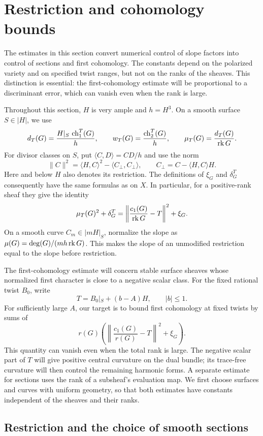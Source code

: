 \section{Restriction and cohomology bounds}
\label{sec:analysis}

The estimates in this section convert numerical control of slope factors
into control of sections and first cohomology.  The constants depend on the
polarized variety and on specified twist ranges, but not on the ranks of
the sheaves.  This distinction is essential: the first-cohomology estimate
will be proportional to a discriminant error, which can vanish even when
the rank is large.

Throughout this section, $H$ is very ample and $h=H^3$.  On a smooth
surface $S\in|H|$, we use
\[
 d_T(G)=\frac{H|_S\,\operatorname{ch}_1^T(G)}h,
 \qquad w_T(G)=\frac{\operatorname{ch}_2^T(G)}h,
 \qquad \mu_T(G)=\frac{d_T(G)}{\operatorname{rk} G}.
\]
For divisor classes on $S$, put $\langle C,D\rangle=CD/h$ and use the
norm
\[
 \|C\|^2=\langle H,C\rangle^2-\langle C_\perp,C_\perp\rangle,
 \qquad C_\perp=C-\langle H,C\rangle H.
\]
Here and below $H$ also denotes its restriction.  The definitions of
$\xi_G$ and $\delta_G^T$ consequently have the same formulas as on $X$.
In particular, for a positive-rank sheaf they give the identity
\begin{equation}\label{eq:surface-norm-discriminant}
 \mu_T(G)^2+\delta_G^T
 =\left\|\frac{c_1(G)}{\operatorname{rk} G}-T\right\|^2+\xi_G.
\end{equation}
On a smooth curve $C_m\in|mH|_S$, normalize the slope as
$\mu(G)=\deg(G)/(mh\operatorname{rk} G)$.  This makes the slope of an unmodified
restriction equal to the slope before restriction.

The first-cohomology estimate will concern stable surface sheaves
whose normalized first character is close to a negative scalar class.
For the fixed rational twist $B_0$, write
\[
 T=B_0|_S+(b-A)H,\qquad |b|\le1.
\]
For sufficiently large $A$, our target is to bound first cohomology
at fixed twists by sums of
\[
 r(G)\left(\left\|\frac{c_1(G)}{r(G)}-T\right\|^2+\xi_G\right).
\]
This quantity can vanish even when the total rank is large.  The
negative scalar part of $T$ will give positive central curvature on
the dual bundle; its trace-free curvature will then control the
remaining harmonic forms.  A separate estimate for sections uses the
rank of a subsheaf's evaluation map.  We first choose surfaces and
curves with uniform geometry, so that both estimates have constants
independent of the sheaves and their ranks.

\subsection{Restriction and the choice of smooth sections}

